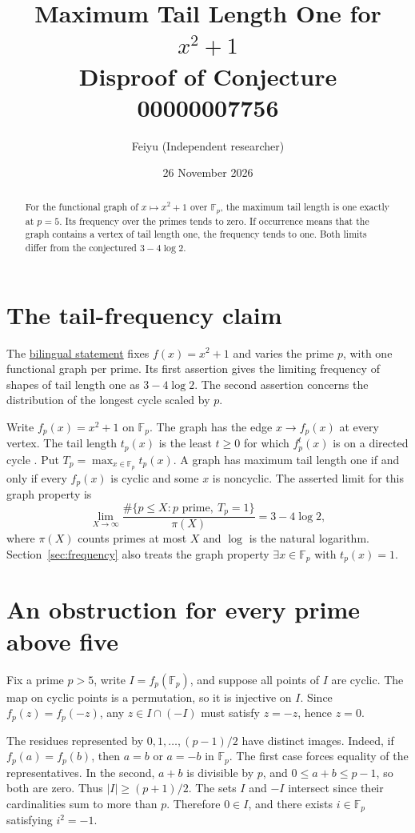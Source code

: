\documentclass[11pt]{article}
\title{Maximum Tail Length One for $x^2+1$\\[4pt]
  \large Disproof of Conjecture 00000007756}
\author{Feiyu (Independent researcher)}
\date{26 November 2026}
\begin{document}
\maketitle

\begin{abstract}
For the functional graph of $x\mapsto x^2+1$ over $\mathbb F_p$, the
maximum tail length is one exactly at $p=5$. Its frequency over the
primes tends to zero. If occurrence means that the graph contains a
vertex of tail length one, the frequency tends to one. Both limits
differ from the conjectured $3-4\log 2$.
\end{abstract}

\section{The tail-frequency claim}

The \href{https://github.com/The-Last-Math-Competition/The-Last-Math-Competition/blob/main/conjectures/00000007756.md}{bilingual
statement} fixes $f(x)=x^2+1$ and varies the prime $p$, with one
functional graph per prime. Its first assertion gives the limiting
frequency of shapes of tail length one as $3-4\log 2$. The second
assertion concerns the distribution of the longest cycle scaled by $p$.

Write $f_p(x)=x^2+1$ on $\mathbb F_p$. The graph has the edge
$x\to f_p(x)$ at every vertex. The tail length $t_p(x)$ is the least
$t\ge0$ for which $f_p^t(x)$ is on a directed cycle \cite[Section~1]{vs}.
Put $T_p=\max_{x\in\mathbb F_p} t_p(x)$. A graph has maximum tail length
one if and only if every $f_p(x)$ is cyclic and some $x$ is noncyclic.
The asserted limit for this graph property is
\[
  \lim_{X\to\infty}
  \frac{\#\{p\le X : p\text{ prime},\ T_p=1\}}{\pi(X)}
  =3-4\log 2 ,
\]
where $\pi(X)$ counts primes at most $X$ and $\log$ is the natural
logarithm. Section~\ref{sec:frequency} also treats the graph property
$\exists x\in\mathbb F_p$ with $t_p(x)=1$.

\section{An obstruction for every prime above five}

Fix a prime $p>5$, write $I=f_p(\mathbb F_p)$, and suppose all points
of $I$ are cyclic. The map on cyclic points is a permutation, so it
is injective on $I$. Since $f_p(z)=f_p(-z)$, any $z\in I\cap(-I)$
must satisfy $z=-z$, hence $z=0$.

The residues represented by $0,1,\ldots,(p-1)/2$ have distinct images.
Indeed, if $f_p(a)=f_p(b)$, then $a=b$ or $a=-b$ in $\mathbb F_p$.
The first case forces equality of the representatives. In the second,
$a+b$ is divisible by $p$, and $0\le a+b\le p-1$, so both are zero.
Thus $|I|\ge (p+1)/2$. The sets $I$ and $-I$ intersect since their
cardinalities sum to more than $p$. Therefore $0\in I$, and there
exists $i\in\mathbb F_p$ satisfying $i^2=-1$.
\end{document}
